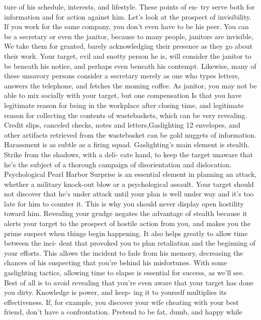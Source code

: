 \documentclass{book}
\begin{document}
ture of his schedule, interests, and lifestyle. These points of en- 
try serve both for information and for action against him. 
Let's look at the prospect of invisibility. If you work for the 
same company, you don't even have to be his peer. You can be 
a secretary or even the janitor, because to many people, janitors 
are invisible, We take them for granted, barely acknowledging 
their presence as they go about their work. Your target, evil and 
snotty person he is, will consider the janitor to be beneath his 
notice, and perhaps even beneath his contempt. Likewise, many 
of these unsavory persons consider a secretary merely as one 
who types letters, answers the telephone, and fetches the 
moming coffee. 
As janitor, you may not be able to mix socially with your 
target, but one compensation Is that you have legitimate reason 
for being in the workplace after closing time, and legitimate 
reason for collecting the contents of wastebaskets, which can be 
very revealing. Credit slips, canceled checks, notes and letters,Gaslighting 
12 
envelopes, and other artifacts retrieved from the wastebasket 
can be gold nuggets of information. 
Harassment is as subtle as a firing squad. Gaslighting's 
main element is stealth. Strike from the shadows, with a deli- 
cate hand, to keep the target unaware that he's the subject of a 
thorough campaign of disorientation and dislocation. 
Psychological Pearl Harbor 
Surprise is an essential element in planning an attack, 
whether a military knock-out blow or a psychological assault. 
Your target should not discover that he's under attack until your 
plan is well under way and it's too late for him to counter it. 
This is why you should never display open hostility toward 
him. Revealing your grudge negates the advantage of stealth 
because it alerts your target to the prospect of hostile action 
from you, and makes you the prime suspect when things begin 
happening. It also helps greatly to allow time between the inci- 
dent that provoked you to plan retaliation and the beginning of 
your efforts. This allows the incident to fade from his memory, 
decreasing the chances of his suspecting that you're behind his 
misfortunes. With some gaslighting tactics, allowing time to 
elapse is essential for success, as we'll see. 
Best of all is to avoid revealing that you're even aware that 
your target has done you dirty. Knowledge is power, and keep- 
ing it to yourself multiplies its effectiveness. If, for example, 
you discover your wife cheating with your best friend, don't 
have a confrontation. Pretend to be fat, dumb, and happy while 
\end{document}
